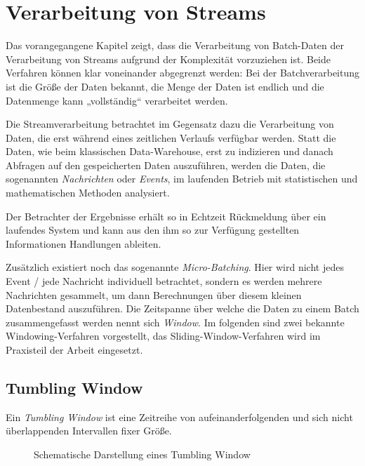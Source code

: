 \documentclass[a4paper,11pt]{scrartcl}
\begin{document}
  \section{Verarbeitung von Streams}
  Das vorangegangene Kapitel zeigt, dass die Verarbeitung von Batch-Daten der
  Verarbeitung von Streams aufgrund der Komplexität vorzuziehen ist. Beide
  Verfahren können klar voneinander abgegrenzt werden: Bei der Batchverarbeitung
  ist die Größe der Daten bekannt, die Menge der Daten ist endlich und die
  Datenmenge kann „vollständig“ verarbeitet werden.

  Die Streamverarbeitung betrachtet im Gegensatz dazu die Verarbeitung von
  Daten, die erst während eines zeitlichen Verlaufs verfügbar werden. Statt die
  Daten, wie beim klassischen Data-Warehouse, erst zu indizieren und danach
  Abfragen auf den gespeicherten Daten auszuführen, werden die Daten, die
  sogenannten \textit{Nachrichten} oder \textit{Events}, im laufenden Betrieb
  mit statistischen und mathematischen Methoden analysiert.

  Der Betrachter der Ergebnisse erhält so in Echtzeit Rückmeldung über ein
  laufendes System und kann aus den ihm so zur Verfügung gestellten Informationen
  Handlungen ableiten.

  Zusätzlich existiert noch das sogenannte \textit{Micro-Batching}.  Hier wird
  nicht jedes Event / jede Nachricht individuell betrachtet, sondern es werden
  mehrere Nachrichten gesammelt, um dann Berechnungen über diesem kleinen
  Datenbestand auszuführen. Die Zeitspanne über welche die Daten zu einem Batch
  zusammengefasst werden nennt sich \textit{Window}.\cite[S.~452]{kleppmann17}
  Im folgenden sind zwei bekannte Windowing-Verfahren vorgestellt, das
  Sliding-Window-Verfahren wird im Praxisteil der Arbeit eingesetzt.

  \subsection{Tumbling Window}
  Ein \textit{Tumbling Window} ist eine Zeitreihe von aufeinanderfolgenden und
  sich nicht überlappenden Intervallen fixer Größe.
  \begin{figure}[!h]
    \centering
    \caption{Schematische Darstellung eines Tumbling Window}
  \end{figure}
\end{document}
